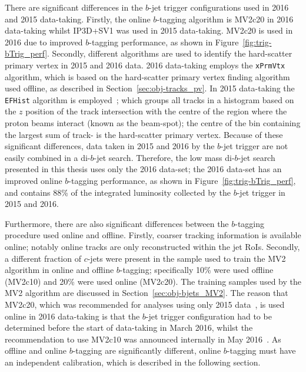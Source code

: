 There are significant differences in the  $b$-jet trigger configurations used in 2016 and 2015 data-taking.
Firstly, the online $b$-tagging algorithm is MV2c20 in 2016 data-taking whilst IP3D+SV1 was used in 2015 data-taking.
MV2c20 is used in 2016 due to improved $b$-tagging performance, as shown in Figure~\ref{fig:trig-bTrig_perf}.
Secondly, different algorithms are used to identify the hard-scatter primary vertex in 2015 and 2016 data.
2016 data-taking employs the \verb|xPrmVtx| algorithm, which is based on the hard-scatter primary vertex finding algorithm used offline, as described in Section~\ref{sec:obj-tracks_pv}.
In 2015 data-taking the \verb|EFHist| algorithm is employed~\cite{trig-EFHist};
which groups all tracks in a histogram based on the $z$ position of the track intersection with the centre of the region where the proton beams interact (known as the beam-spot);
the centre of the bin containing the largest sum of track-\pT{} is the hard-scatter primary vertex.
Because of these significant differences, data taken in 2015 and 2016 by the $b$-jet trigger are not easily combined in a di-$b$-jet search.
Therefore, the low mass di-$b$-jet search presented in this thesis uses only the 2016 data-set;
the 2016 data-set has an improved online $b$-tagging performance, as shown in Figure~\ref{fig:trig-bTrig_perf},
and contains 88\% of the integrated luminosity collected by the $b$-jet trigger in 2015 and 2016.

Furthermore, there are also significant differences between the $b$-tagging procedure used online and offline.
Firstly, coarser tracking information is available online; notably online tracks are only reconstructed within the jet RoIs.
Secondly, a different fraction of $c$-jets were present in the sample used to train the MV2 algorithm in online and offline $b$-tagging;
specifically 10\% were used offline (MV2c10) and 20\% were used online (MV2c20).
The training samples used by the MV2 algorithm are discussed in Section~\ref{sec:obj-bjets_MV2}.
The reason that MV2c20, which was recommended for analyses using only 2015 data~\cite{obj-bjets_algo_2015}, is used online in 2016 data-taking is that the $b$-jet trigger configuration
had to be determined before the start of data-taking in March 2016,
whilst the recommendation to use MV2c10 was announced internally in May 2016~\cite{obj-bjets_algo_2016}.
As offline and online $b$-tagging are significantly different, online $b$-tagging must have an independent calibration, which is described in the following section.


